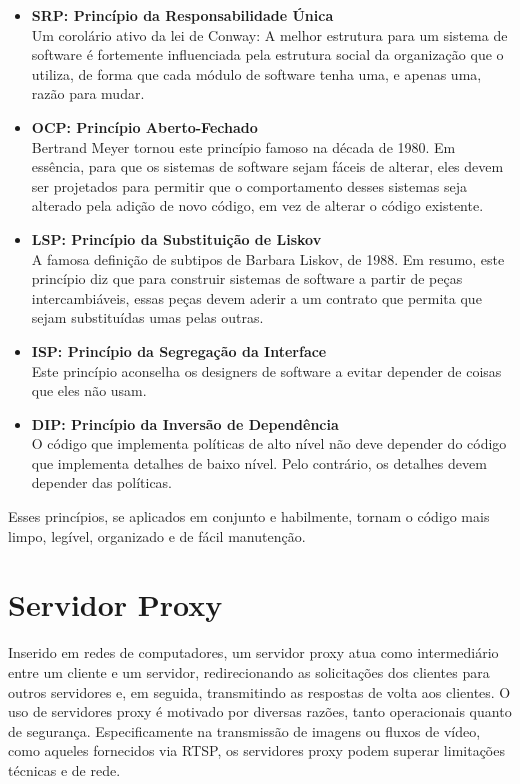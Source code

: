 \documentclass[12pt, %
openright, 
oneside, %
a4paper,    %
brazil]{facom-ufu-abntex2}
\begin{document}
\begin{itemize}
	\item \textbf{SRP: Princípio da Responsabilidade Única}\\
	      Um corolário ativo da lei de Conway: A melhor estrutura para um
	      sistema de software é fortemente influenciada pela estrutura social da
	      organização que o utiliza, de forma que cada módulo de software tenha uma, e
	      apenas uma, razão para mudar.

	\item \textbf{OCP: Princípio Aberto-Fechado}\\
	      Bertrand Meyer tornou este princípio famoso na década de 1980. Em
	      essência, para que os sistemas de software sejam fáceis de alterar, eles devem
	      ser projetados para permitir que o comportamento desses sistemas seja alterado
	      pela adição de novo código, em vez de alterar o código existente.

	\item \textbf{LSP: Princípio da Substituição de Liskov}\\
	      A famosa definição de subtipos de Barbara Liskov, de 1988. Em
	      resumo, este princípio diz que para construir sistemas de software a partir de
	      peças intercambiáveis, essas peças devem aderir a um contrato que permita que
	      sejam substituídas umas pelas outras.

	\item \textbf{ISP: Princípio da Segregação da Interface}\\
	      Este princípio aconselha os designers de software a evitar
	      depender de coisas que eles não usam.

	\item \textbf{DIP: Princípio da Inversão de Dependência}\\
	      O código que implementa políticas de alto nível não deve depender
	      do código que implementa detalhes de baixo nível. Pelo contrário, os detalhes
	      devem depender das políticas.
\end{itemize}

Esses princípios, se aplicados em conjunto e habilmente, tornam o código mais
limpo, legível, organizado e de fácil manutenção. \cite{martin2018clean3}

\section{Servidor Proxy}

Inserido em redes de computadores, um servidor proxy atua como intermediário
entre um cliente e um servidor, redirecionando as solicitações dos clientes
para outros servidores e, em seguida, transmitindo as respostas de volta aos
clientes. O uso de servidores proxy é motivado por diversas razões, tanto
operacionais quanto de segurança. Especificamente na transmissão de imagens ou
fluxos de vídeo, como aqueles fornecidos via RTSP, os servidores proxy podem
superar limitações técnicas e de rede.
\end{document}
